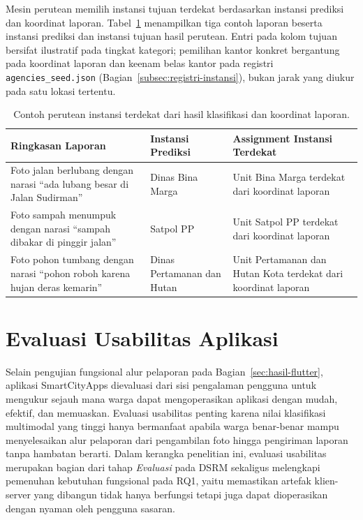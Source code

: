 Mesin perutean memilih instansi tujuan terdekat berdasarkan instansi prediksi dan koordinat laporan. Tabel~\ref{tab:demo-perutean} menampilkan tiga contoh laporan beserta instansi prediksi dan instansi tujuan hasil perutean. Entri pada kolom tujuan bersifat ilustratif pada tingkat kategori; pemilihan kantor konkret bergantung pada koordinat laporan dan keenam belas kantor pada registri \texttt{agencies\_seed.json} (Bagian~\ref{subsec:registri-instansi}), bukan jarak yang diukur pada satu lokasi tertentu.

\begin{table}[htbp]
\centering
\small
\caption{Contoh perutean instansi terdekat dari hasil klasifikasi dan koordinat laporan.}
\label{tab:demo-perutean}
\begin{tabular}{p{4.5cm} p{3.5cm} p{4.5cm}}
\toprule
\textbf{Ringkasan Laporan} & \textbf{Instansi Prediksi} & \textbf{Assignment Instansi Terdekat} \\
\midrule
Foto jalan berlubang dengan narasi ``ada lubang besar di Jalan Sudirman'' & Dinas Bina Marga & Unit Bina Marga terdekat dari koordinat laporan \\
Foto sampah menumpuk dengan narasi ``sampah dibakar di pinggir jalan'' & Satpol PP & Unit Satpol PP terdekat dari koordinat laporan \\
Foto pohon tumbang dengan narasi ``pohon roboh karena hujan deras kemarin'' & Dinas Pertamanan dan Hutan & Unit Pertamanan dan Hutan Kota terdekat dari koordinat laporan \\
\bottomrule
\end{tabular}
\end{table}

\section{Evaluasi Usabilitas Aplikasi}
\label{sec:evaluasi-usabilitas}

Selain pengujian fungsional alur pelaporan pada Bagian~\ref{sec:hasil-flutter}, aplikasi SmartCityApps dievaluasi dari sisi pengalaman pengguna untuk mengukur sejauh mana warga dapat mengoperasikan aplikasi dengan mudah, efektif, dan memuaskan. Evaluasi usabilitas penting karena nilai klasifikasi multimodal yang tinggi hanya bermanfaat apabila warga benar-benar mampu menyelesaikan alur pelaporan dari pengambilan foto hingga pengiriman laporan tanpa hambatan berarti. Dalam kerangka penelitian ini, evaluasi usabilitas merupakan bagian dari tahap \textit{Evaluasi} pada DSRM sekaligus melengkapi pemenuhan kebutuhan fungsional pada RQ1, yaitu memastikan artefak klien-server yang dibangun tidak hanya berfungsi tetapi juga dapat dioperasikan dengan nyaman oleh pengguna sasaran.

